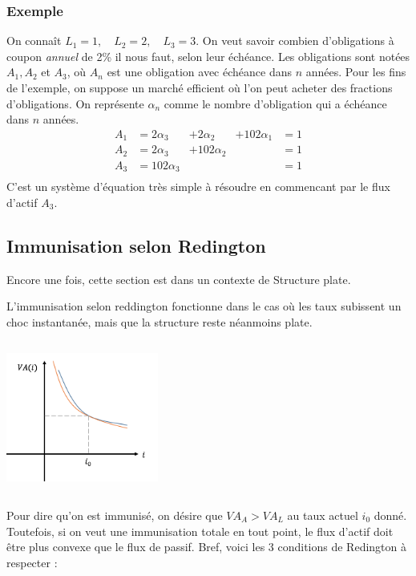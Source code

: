 \documentclass[12pt, french]{report}
\begin{document}
\subsubsection*{Exemple}
On connaît $L_1 =1, \quad L_2 = 2, \quad L_3 = 3$. On veut savoir combien
d'obligations à coupon \emph{annuel} de 2\% il nous faut, selon leur échéance.
Les obligations sont notées $A_1, A_2$ et $A_3$, où $A_n$ est une obligation avec
échéance dans $n$ années. Pour les fins de l'exemple, on suppose un marché efficient
où l'on peut acheter des fractions d'obligations.
\p
On représente $\alpha_n$ comme le nombre d'obligation qui a échéance dans $n$ années.
\begin{align*}
	A_1	& = 2 \alpha_3		& + 2 \alpha_2			& + 102 \alpha_1			& = 1 \\
	A_2	& = 2 \alpha_3		& + 102 \alpha_2		& 										& = 1 \\
	A_3	& = 102 \alpha_3	& 									& 										& = 1 \\
\end{align*}
C'est un système d'équation très simple à résoudre en commencant par le flux d'actif $A_3$.


\subsection{Immunisation selon Redington}
\bcsmbh Encore une fois, cette section est dans un contexte de Structure plate.

\bcattention L'immunisation selon reddington fonctionne dans le cas où les taux
subissent un choc instantanée, mais que la structure reste néanmoins plate.
\begin{center}
	\includegraphics[width = 5cm, height = 5cm]{Reddington_graph.png}
\end{center}
Pour dire qu'on est immunisé, on désire que $VA_A > VA_L$ au taux actuel $i_0$ donné.
Toutefois, si on veut une immunisation totale en tout point, le flux d'actif doit
être plus convexe que le flux de passif. Bref, voici les 3 conditions de Redington
à respecter :
\end{document}
